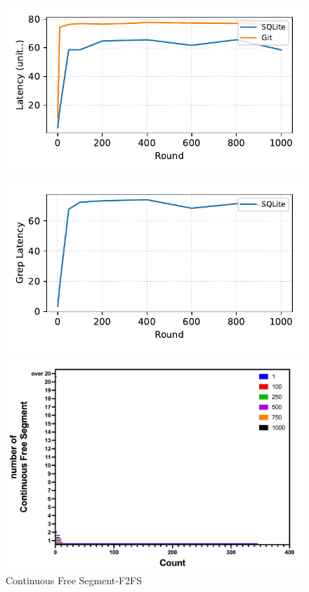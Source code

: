 \begin{figure}[t]
    \centering
    \includegraphics[width=0.95\columnwidth]{graphs/py_graph/latency}
    \caption{}
    \label{f:latency}
\end{figure}

\begin{figure}[t]
    \centering
    \includegraphics[width=0.95\columnwidth]{graphs/py_graph/latency-f2fs}
    \caption{}
    \label{f:f2fs_latency}
\end{figure}


\begin{figure}[t]
    \centering
	\includegraphics[width=0.95\columnwidth]{graphs/continuous_free_segment_fsfs}
	\caption{Continuous Free Segment-F2FS}
	\label{f:continuous_free_segment_fsfs}
\end{figure}


